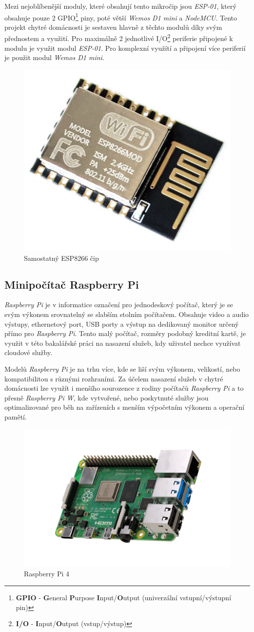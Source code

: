 Mezi nejoblíbenější moduly, které obsahují tento mikročip jsou \emph{ESP-01}, který obsahuje pouze 2 GPIO\footnote{\textbf{GPIO} - \textbf{G}eneral \textbf{P}urpose \textbf{I}nput/\textbf{O}utput (univerzální vstupní/výstupní pin)} piny, poté větší \emph{Wemos D1 mini} a \emph{NodeMCU}.
Tento projekt chytré domácnosti je sestaven hlavně z těchto modulů díky svým přednostem a využití.
Pro maximálně 2 jednotlivé I/O\footnote{\textbf{I/O} - \textbf{I}nput/\textbf{O}utput (vstup/výstup)} periferie připojené k modulu je využit modul \emph{ESP-01}.
Pro komplexní využítí a připojení více periferií je použit modul \emph{Wemos D1 mini}.

\begin{figure}[hbt]
  \centering
  \includegraphics[width=.2 \linewidth]{obrazky-figures/esp_standalone.png}
  \caption{Samostatný ESP8266 čip}
  \label{figure:esp8266}
\end{figure}

\subsection*{Minipočítač Raspberry Pi}
\label{terminy:raspberry}

\emph{Raspberry Pi} je v informatice označení pro jednodeskový počítač, který je se svým výkonem srovnatelný se slabším stolním počítačem.
Obsahuje video a audio výstupy,
ethernetový port, USB porty a výstup na dedikovaný monitor určený přímo pro \emph{Raspberry Pi}.
Tento malý počítač, rozměry podobný kreditní kartě, je využit v této bakalářské práci na nasazení služeb, kdy uživatel nechce využívat cloudové služby.

Modelů \emph{Raspberry Pi} je na trhu více, kde se liší svým výkonem, velikostí, nebo kompatibilitou s různými rozhraními.
Za účelem nasazení služeb v chytré domácnosti lze využít i menšího sourozence z rodiny počítačů \emph{Raspberry Pi} a to přesně \emph{Raspberry Pi W},
kde vytvořené, nebo poskytnuté služby jsou optimalizované pro běh na zařízeních s menším výpočetním výkonem a operační pamětí.

\begin{figure}[ht]
  \centering
  \includegraphics[width=.5 \linewidth]{obrazky-figures/raspberry.png}
  \caption{Raspberry Pi 4}
\end{figure}

